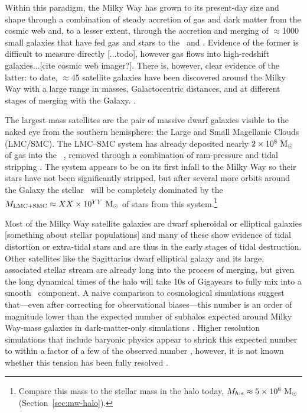Within this paradigm, the Milky Way has grown to its present-day size and shape
through a combination of steady accretion of gas and dark matter from the cosmic
web and, to a lesser extent, through the accretion and merging of $\approx$1000
small galaxies that have fed gas and stars to the \mwdisk\ and \mwhalo. Evidence
of the former is difficult to measure directly [...todo], however gas flows into
high-redshift galaxies...[cite cosmic web imager?]. There is, however, clear
evidence of the latter: to date, $\approx$45 satellite galaxies have been
discovered around the Milky Way with a large range in masses, Galactocentric
distances, and at different stages of merging with the Galaxy. .

The largest mass satellites are the pair of massive dwarf galaxies visible to
the naked eye from the southern hemisphere: the Large and Small Magellanic
Clouds (LMC/SMC). The LMC--SMC system has already deposited nearly $2 \times
10^{8}~\mathrm{M}_\odot$ of gas into the \mwhalo\ \citep{putman03}, removed through a
combination of ram-pressure and tidal stripping \citep{salem15}. The system
appears to be on its first infall to the Milky Way \citep{besla10} so their
stars have not been significantly stripped, but after several more orbits around
the Galaxy the stellar \mwhalo\ will be completely dominated by the $M_{\rm
LMC+SMC} \approx XX \times 10^{YY}~\mathrm{M}_\odot$ of stars from this
system.\footnote{Compare this mass to the stellar mass in the halo today,
$M_{h:s} \approx 5 \times 10^8~\mathrm{M}_\odot$ (Section~\ref{sec:mw-halo}).}

Most of the Milky Way satellite galaxies are dwarf spheroidal or elliptical
galaxies [something about stellar populations] and many of these show evidence
of tidal distortion or extra-tidal stars \citep[e.g.,][]{todo-hercules, todo}
and are thus in the early stages of tidal destruction. Other satellites like the
Sagittarius dwarf elliptical galaxy and its large, associated stellar stream are
already long into the process of merging, but given the long dynamical times of
the halo will take 10s of Gigayears to fully mix into a smooth \mwhalo\
component. A naive comparison to cosmological simulations suggest that---even
after correcting for observational biases---this number is an order of magnitude
lower than the expected number of subhalos expected around Milky Way-mass
galaxies in dark-matter-only simulations \citep[$\sim$1000;][]{missing-
satellites-todo}. Higher resolution simulations that include baryonic physics
appear to shrink this expected number to within a factor of a few of the
observed number \citep{todo}, however, it is not known whether this tension has
been fully resolved \citep{todo}.

